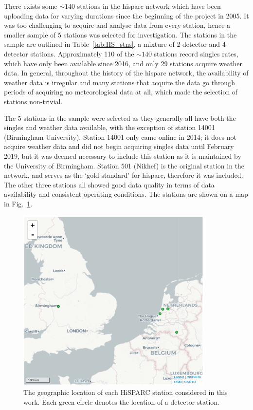 There exists some $\sim 140$ stations in the \gls{hisparc} network \citep{van_dam_hisparc_2020} which have been uploading data for varying durations since the beginning of the project in 2005. It was too challenging to acquire and analyse data from every station, hence a smaller sample of 5 stations was selected for investigation. The stations in the sample are outlined in Table~\ref{tab:HS_stns}, a mixture of 2-detector and 4-detector stations. Approximately 110 of the $\sim 140$ stations record singles rates, which have only been available since 2016, and only 29 stations acquire weather data. In general, throughout the history of the \gls{hisparc} network, the availability of weather data is irregular and many stations that acquire the data go through periods of acquiring no meteorological data at all, which made the selection of stations non-trivial. 

The 5 stations in the sample were selected as they generally all have both the singles and weather data available, with the exception of station 14001 (Birmingham University). Station 14001 only came online in 2014; it does not acquire weather data and did not begin acquiring singles data until February 2019, but it was deemed necessary to include this station as it is maintained by the University of Birmingham. Station 501 (Nikhef) is the original station in the network, and serves as the `gold standard' for \gls{hisparc}, therefore it was included. The other three stations all showed good data quality in terms of data availability and consistent operating conditions. The stations are shown on a map in Fig.~\ref{fig:HS_map}.


\begin{figure}[ht!]
	\centering
	\includegraphics[width=0.75\columnwidth]{HS_station_map.pdf}
	\caption{The geographic location of each HiSPARC station considered in this work. Each green circle denotes the location of a detector station.}
	\label{fig:HS_map}
\end{figure}



